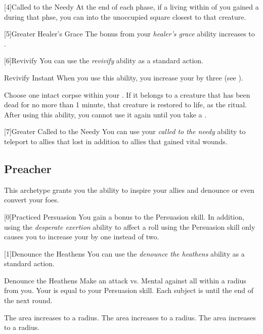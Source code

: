         [4]{Called to the Needy} At the end of each phase, if a living  within \distrange of you gained a  during that phse, you can  into the unoccupied square closest to that creature.

        [5]{Greater Healer's Grace} The bonus from your \textit{healer's grace} ability increases to .

        [6]{Revivify} You can use the \textit{revivify} ability as a standard action.
        \begin{instantability}{Revivify}
            Instant
            \rankline
            When you use this ability, you increase your  by three (see ).

            Choose one intact corpse within your .
            If it belongs to a creature that has been dead for no more than 1 minute, that creature is restored to life, as the  ritual.
            After using this ability, you cannot use it again until you take a .
        \end{instantability}

        [7]{Greater Called to the Needy} You can use your \textit{called to the needy} ability to teleport to allies that lost  in addition to allies that gained vital wounds.

    \newpage
    \subsection{Preacher}
        This archetype grants you the ability to inspire your allies and denounce or even convert your foes.

        [0]{Practiced Persuasion} You gain a  bonus to the Persuasion skill.
        In addition, using the \textit{desperate exertion} ability to affect a roll using the Persuasion skill only causes you to increase your  by one instead of two.

        [1]{Denounce the Heathens} You can use the \textit{denounce the heathens} ability as a standard action.
        \begin{instantability}{Denounce the Heathens}
            Make an attack vs. Mental against all  within a \medarea radius from you.
            Your  is equal to your Persuasion skill.
            \hit Each subject is \dazed until the end of the next round.

            \rankline
             The area increases to a \largearea radius.
             The area increases to a \hugearea radius.
             The area increases to a \gargarea radius.
        \end{instantability}

